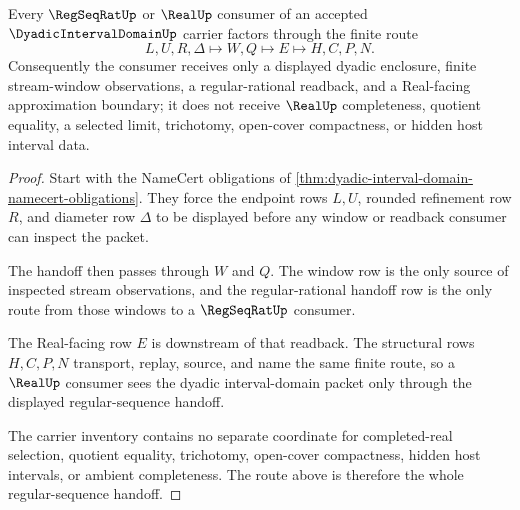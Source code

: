 \begin{theorem}
\label{thm:dyadic-interval-domain-regular-sequence-handoff}
Every $\RegSeqRatUp$ or $\RealUp$ consumer of an accepted $\DyadicIntervalDomainUp$ carrier factors through the finite route
$$
L,U,R,\Delta \longmapsto W,Q \longmapsto E \longmapsto H,C,P,N .
$$
Consequently the consumer receives only a displayed dyadic enclosure, finite stream-window observations, a regular-rational readback, and a Real-facing approximation boundary; it does not receive $\RealUp$ completeness, quotient equality, a selected limit, trichotomy, open-cover compactness, or hidden host interval data.
\end{theorem}
\begin{proof}
Start with the NameCert obligations of \autoref{thm:dyadic-interval-domain-namecert-obligations}. They force the endpoint rows $L,U$, rounded refinement row $R$, and diameter row $\Delta$ to be displayed before any window or readback consumer can inspect the packet.

The handoff then passes through $W$ and $Q$. The window row is the only source of inspected stream observations, and the regular-rational handoff row is the only route from those windows to a $\RegSeqRatUp$ consumer.

The Real-facing row $E$ is downstream of that readback. The structural rows $H,C,P,N$ transport, replay, source, and name the same finite route, so a $\RealUp$ consumer sees the dyadic interval-domain packet only through the displayed regular-sequence handoff.

The carrier inventory contains no separate coordinate for completed-real selection, quotient equality, trichotomy, open-cover compactness, hidden host intervals, or ambient completeness. The route above is therefore the whole regular-sequence handoff.
\end{proof}



